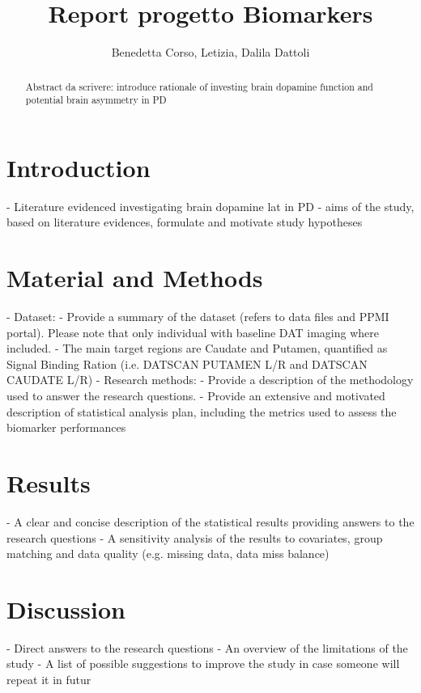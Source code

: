 \documentclass[]{article}
\title{Report progetto Biomarkers}
\author{Benedetta Corso, Letizia, Dalila Dattoli}
\begin{document}
\maketitle

\begin{abstract}
Abstract da scrivere: introduce rationale of investing brain dopamine function and potential brain asymmetry in PD
\end{abstract}

\section{Introduction}

- Literature evidenced investigating brain dopamine lat in PD
- aims of the study, based on literature evidences, 
formulate and motivate study hypotheses

\section{Material and Methods}

- Dataset:
\newline
	- Provide a summary of the dataset (refers to data files and PPMI
	portal). Please note that only individual with baseline DAT imaging 
	where included.
\newline
	- The main target regions are Caudate and Putamen, quantified as 
	Signal Binding Ration (i.e. DATSCAN PUTAMEN L/R and 
	DATSCAN CAUDATE L/R)
\newline
- Research methods:
\newline
	- Provide a description of the methodology used to answer the research 
	questions. 
	\newline
	- Provide an extensive and motivated description of statistical analysis plan, including the metrics used to assess the biomarker 
	performances

\section{Results}

- A clear and concise description of the statistical results 
providing answers to the research questions
\newline
- A sensitivity analysis of the results to covariates, group  matching and data quality (e.g. missing data, data miss balance)

\section{Discussion}

- Direct answers to the research questions
\newline
- An overview of the limitations of the study
\newline
- A list of possible suggestions to improve the study in case 
someone will repeat it in futur
\end{document}
